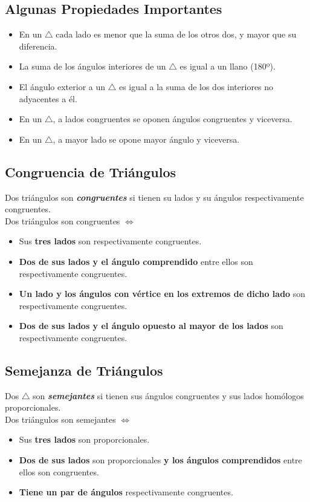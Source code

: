 \documentclass[10pt]{article}
\begin{document}
\subsection{Algunas Propiedades Importantes}
\begin{itemize}
\item En un $\triangle$ cada lado es menor que la suma de los otros dos, y mayor que su diferencia.
\item La suma de los ángulos interiores de un $\triangle$ es igual a un llano (180º).
\item El ángulo exterior a un $\triangle$ es igual a la suma de los dos interiores no adyacentes a él.
\item En un $\triangle$, a lados congruentes se oponen ángulos congruentes y viceversa.
\item En un $\triangle$, a mayor lado se opone mayor ángulo y viceversa.
\end{itemize}
\subsection{Congruencia de Triángulos}
Dos triángulos son \textbf{\textit{congruentes}} si tienen su lados y su ángulos respectivamente congruentes.\\ Dos triángulos son congruentes $\iff$
\begin{itemize}
\item Sus \textbf{tres lados} son respectivamente congruentes.
\item \textbf{Dos de sus lados y el ángulo comprendido} entre ellos son respectivamente congruentes. 
\item \textbf{Un lado y los ángulos con vértice en los extremos de dicho lado} son respectivamente congruentes.
\item \textbf{Dos de sus lados y el ángulo opuesto al mayor de los lados} son respectivamente congruentes.
\end{itemize}
\newpage
\subsection{Semejanza de Triángulos}
Dos $\triangle$ son \textbf{\textit{semejantes}} si tienen sus ángulos congruentes y sus lados homólogos proporcionales.\\
Dos triángulos son semejantes $\iff$
\begin{itemize}
\item Sus \textbf{tres lados} son proporcionales.
\item \textbf{Dos de sus lados} son proporcionales \textbf{y los ángulos comprendidos} entre ellos son congruentes.
\item \textbf{Tiene un par de ángulos} respectivamente congruentes.
\end{itemize}
\end{document}
